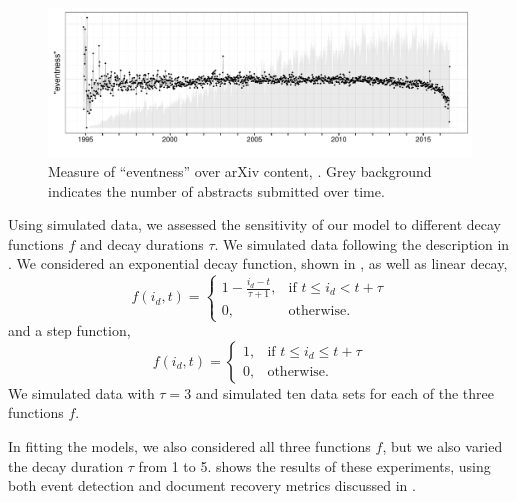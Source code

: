 \begin{figure}[ht]
\centering
\includegraphics[width=\linewidth]{fig/arxiv_events.pdf}
\caption{Measure of ``eventness'' over arXiv content, .  Grey background indicates the number of abstracts submitted over time.}
\label{fig:arxiv_events}
\end{figure}

  Using simulated data, we assessed the sensitivity of our model to different decay functions $f$ and decay durations $\tau$.  We simulated data following the description in .  We considered an exponential decay function, shown in , as well as linear decay,
\begin{equation}
f(i_d, t) = 
\begin{cases}
    1 - \frac{i_d - t}{\tau + 1},			& \text{if } t \le i_d < t+\tau  \\
    0,          & \text{otherwise.}
\end{cases}
\label{eq:flinear}
\end{equation}
and a step function,
\begin{equation}
f(i_d, t) = 
\begin{cases}
    1,			& \text{if } t \le i_d \le t+\tau  \\
    0,          & \text{otherwise.}
\end{cases}
\label{eq:fstep}
\end{equation}
We simulated data with $\tau=3$ and simulated ten data sets for each of the three functions $f$.

In fitting the models, we also considered all three functions $f$, but we also varied the decay duration $\tau$ from 1 to 5.   shows the results of these experiments, using both event detection and document recovery metrics discussed in .

